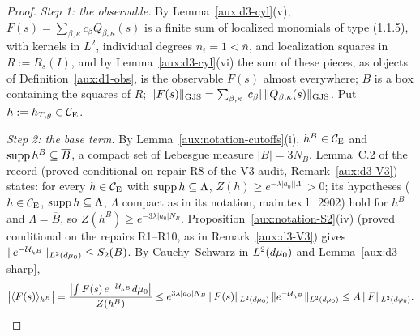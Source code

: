 \begin{proof}
\emph{Step 1: the observable.}  By Lemma~\ref{aux:d3-cyl}(v), $F(s)=\sum_{\beta,\kappa}c_\beta
Q_{\beta,\kappa}(s)$ is a finite sum of localized monomials of type (1.1.5), with kernels in $L^2$,
individual degrees $n_i=1<\bar n$, and localization squares in $R:=R_s(I)$, and by
Lemma~\ref{aux:d3-cyl}(vi) the sum of these pieces, as objects of Definition~\ref{aux:d1-obs}, is
the observable $F(s)$ almost everywhere; $B$ is a box containing the squares of $R$;
$\lVert F(s)\rVert_{\mathrm{GJS}}=\sum_{\beta,\kappa}|c_\beta|\,\lVert Q_{\beta,\kappa}(s)\rVert_{\mathrm{GJS}}$.  Put $h:=h_{T,g}\in\mathcal{C}_{\mathrm E}$.

\emph{Step 2: the base term.}  By Lemma~\ref{aux:notation-cutoffs}(i), $h^B\in\mathcal{C}_{\mathrm E}$ and
$\operatorname{supp} h^B\subseteq\overline B$, a compact set of Lebesgue measure $|B|=3N_B$.  Lemma~C.2 of the
record \cite[p.~40]{R} (proved conditional on repair R8 of the V3 audit,
Remark~\ref{aux:d3-V3}) states: for every $h\in\mathcal{C}_{\mathrm E}$ with $\operatorname{supp} h\subseteq\Lambda$,
$Z(h)\ge e^{-\lambda|a_0||\Lambda|}>0$; its hypotheses ($h\in\mathcal{C}_{\mathrm E}$, $\operatorname{supp} h\subseteq\Lambda$,
$\Lambda$ compact as in its notation, main.tex l.~2902) hold for $h^B$ and $\Lambda=\overline B$,
so $Z(h^B)\ge e^{-3\lambda|a_0|N_B}$.  Proposition~\ref{aux:notation-S2}(iv) (proved conditional
on the repairs R1--R10, as in Remark~\ref{aux:d3-V3}) gives $\|e^{-\mathcal U_{h^B}}\|_{L^2(d\mu_0)}\le
S_2(B)$.  By Cauchy--Schwarz in $L^2(d\mu_0)$ and Lemma~\ref{aux:d3-sharp},
\[
 \bigl|\langle F(s)\rangle_{h^B}\bigr|=\frac{\bigl|\int F(s)\,e^{-\mathcal U_{h^B}}d\mu_0\bigr|}{Z(h^B)}
 \le e^{3\lambda|a_0|N_B}\,\|F(s)\|_{L^2(d\mu_0)}\,\|e^{-\mathcal U_{h^B}}\|_{L^2(d\mu_0)}
 \le A\,\|F\|_{L^2(d\varphi_0)} .
\]


\end{proof}
